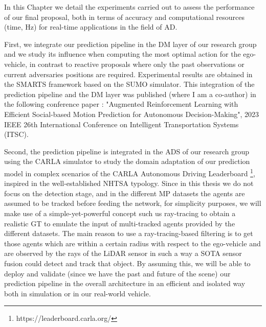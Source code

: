 In this Chapter we detail the experiments carried out to assess the performance of our final proposal, both in terms of accuracy and computational resources (time, Hz) for real-time applications in the field of \ac{AD}. %


First, we integrate our prediction pipeline in the \acf{DM} layer of our research group and we study its influence when computing the most optimal action for the ego-vehicle, in contrast to reactive proposals where only the past observations or current adversaries positions are required. Experimental results are obtained in the \acf{SMARTS} \cite{SMARTS} framework based on the \ac{SUMO} \cite{Sumo} simulator. This integration of the prediction pipeline and the \ac{DM} layer was published (where I am a co-author) in the following conference paper \cite{gutierrez2023augmented}: "Augmented Reinforcement Learning with Efficient Social-based Motion Prediction for Autonomous Decision-Making", 2023 IEEE 26th International Conference on Intelligent Transportation Systems (ITSC).
	
Second, the prediction pipeline is integrated in the \ac{ADS} of our research group using the \acf{CARLA} \cite{dosovitskiy2017carla} simulator to study the domain adaptation of our prediction model in complex scenarios of the \ac{CARLA} Autonomous Driving Leaderboard \footnote{https://leaderboard.carla.org/}, inspired in the well-established \ac{NHTSA} typology. Since in this thesis we do not focus on the detection stage, and in the different \ac{MP} datasets the agents are assumed to be tracked before feeding the network, for simplicity purposes, we will make use of a simple-yet-powerful concept such us ray-tracing to obtain a realistic \acf{GT} to emulate the input of multi-tracked agents provided by the different datasets. The main reason to use a ray-tracing-based filtering is to get those agents which are within a certain radius with respect to the ego-vehicle and are observed by the rays of the \ac{LiDAR} sensor in such a way a \ac{SOTA} sensor fusion could detect and track that object. By assuming this, we will be able to deploy and validate (since we have the past and future of the scene) our prediction pipeline in the overall architecture in an efficient and isolated way both in simulation or in our real-world vehicle.

